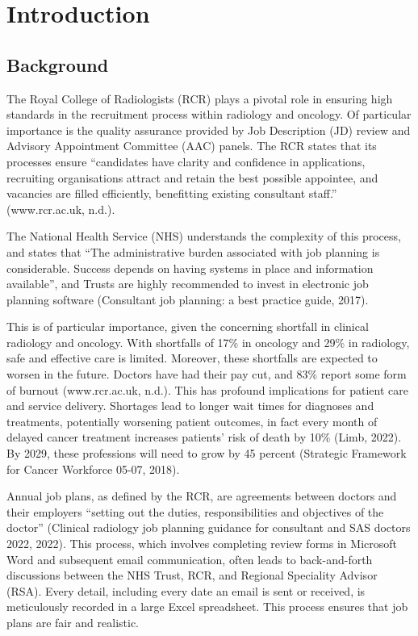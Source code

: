 \section{Introduction}
\subsection{Background}
\begin{multicols}{2}
The Royal College of Radiologists (RCR) plays a pivotal role in ensuring high standards in the recruitment process within radiology and oncology. Of particular importance is the quality assurance provided by Job Description (JD) review and Advisory Appointment Committee (AAC) panels. The RCR states that its processes ensure “candidates have clarity and confidence in applications, recruiting organisations attract and retain the best possible appointee, and vacancies are filled efficiently, benefitting existing consultant staff.” (www.rcr.ac.uk, n.d.). 

The National Health Service (NHS) understands the complexity of this process, and states that “The administrative burden associated with job planning is considerable. Success depends on having systems in place and information available”, and Trusts are highly recommended to invest in electronic job planning software (Consultant job planning: a best practice guide, 2017).

This is of particular importance, given the concerning shortfall in clinical radiology and oncology. With shortfalls of 17\% in oncology and 29\% in radiology, safe and effective care is limited. Moreover, these shortfalls are expected to worsen in the future. Doctors have had their pay cut, and 83\% report some form of burnout (www.rcr.ac.uk, n.d.). This has profound implications for patient care and service delivery. Shortages lead to longer wait times for diagnoses and treatments, potentially worsening patient outcomes, in fact every month of delayed cancer treatment increases patients’ risk of death by 10\% (Limb, 2022). By 2029, these professions will need to grow by 45 percent (Strategic Framework for Cancer Workforce 05-07, 2018).

Annual job plans, as defined by the RCR, are agreements between doctors and their employers “setting out the duties, responsibilities and objectives of the doctor” (Clinical radiology job planning guidance for consultant and SAS doctors 2022, 2022). This process, which involves completing review forms in Microsoft Word and subsequent email communication, often leads to back-and-forth discussions between the NHS Trust, RCR, and Regional Speciality Advisor (RSA). Every detail, including every date an email is sent or received, is meticulously recorded in a large Excel spreadsheet. This process ensures that job plans are fair and realistic.


\end{multicols}
